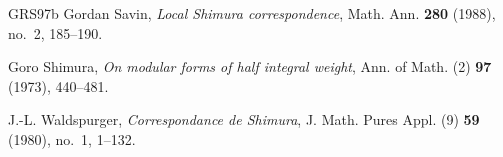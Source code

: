 \documentclass[12pt]{amsart}
\theoremstyle{remark}
\begin{document}
\begin{thebibliography}{GRS97b}
Gordan Savin, \emph{Local {S}himura correspondence}, Math. Ann. \textbf{280}
  (1988), no.~2, 185--190. 

Goro Shimura, \emph{On modular forms of half integral weight}, Ann. of Math.
  (2) \textbf{97} (1973), 440--481. 

J.-L. Waldspurger, \emph{Correspondance de {S}himura}, J. Math. Pures Appl. (9)
  \textbf{59} (1980), no.~1, 1--132. 

\end{thebibliography}
\end{document}
